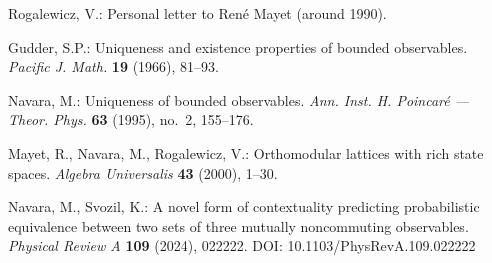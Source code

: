 \documentclass[10pt,a4paper]{amsart}
\begin{document}
\begin{thebibliography}{9}
 Rogalewicz, V.: Personal letter to Ren\'e Mayet (around 1990).

 Gudder, S.P.:
Uniqueness and existence properties of bounded observables. \textit{Pacific J. Math.} {\bf 19} (1966), 81--93.


 Navara, M.:
Uniqueness of bounded observables.
{\it Ann. Inst. H. Poincar\'e --- Theor. Phys.\/}
{\bf 63} (1995), no.~2, 155--176.

 Mayet, R., Navara, M., Rogalewicz, V.:
Orthomodular lattices with rich state spaces.
{\it Algebra Universalis\/} {\bf 43} (2000), 1--30.


 Navara, M., Svozil, K.:
A novel form of contextuality predicting probabilistic equivalence between two sets of three mutually noncommuting observables. \textit{Physical Review A} \textbf{109} (2024), 022222.
DOI: 10.1103/PhysRevA.109.022222

\end{thebibliography}
\end{document}

